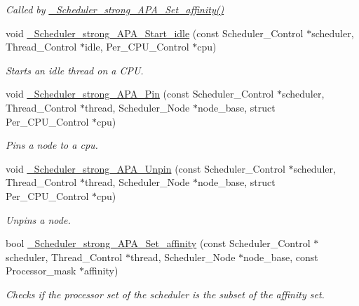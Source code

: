 \begin{DoxyCompactItemize}
\begin{DoxyCompactList}\small\item\em Called by \hyperlink{group__RTEMSScoreSchedulerStrongAPA_ga63ef624a9881cf77a2b1eef2c6f05223}{\+\_\+\+Scheduler\+\_\+strong\+\_\+\+A\+P\+A\+\_\+\+Set\+\_\+affinity()} \end{DoxyCompactList}\item 
void \hyperlink{group__RTEMSScoreSchedulerStrongAPA_ga218140a63c8168bd7a031ecd1622ac70}{\+\_\+\+Scheduler\+\_\+strong\+\_\+\+A\+P\+A\+\_\+\+Start\+\_\+idle} (const Scheduler\+\_\+\+Control $\ast$scheduler, Thread\+\_\+\+Control $\ast$idle, Per\+\_\+\+C\+P\+U\+\_\+\+Control $\ast$cpu)
\begin{DoxyCompactList}\small\item\em Starts an idle thread on a C\+PU. \end{DoxyCompactList}\item 
void \hyperlink{group__RTEMSScoreSchedulerStrongAPA_gab58b35b304568f654b0159782d7101b0}{\+\_\+\+Scheduler\+\_\+strong\+\_\+\+A\+P\+A\+\_\+\+Pin} (const Scheduler\+\_\+\+Control $\ast$scheduler, Thread\+\_\+\+Control $\ast$thread, Scheduler\+\_\+\+Node $\ast$node\+\_\+base, struct Per\+\_\+\+C\+P\+U\+\_\+\+Control $\ast$cpu)
\begin{DoxyCompactList}\small\item\em Pins a node to a cpu. \end{DoxyCompactList}\item 
void \hyperlink{group__RTEMSScoreSchedulerStrongAPA_ga14316e4743f9418a6fba4de3d982418a}{\+\_\+\+Scheduler\+\_\+strong\+\_\+\+A\+P\+A\+\_\+\+Unpin} (const Scheduler\+\_\+\+Control $\ast$scheduler, Thread\+\_\+\+Control $\ast$thread, Scheduler\+\_\+\+Node $\ast$node\+\_\+base, struct Per\+\_\+\+C\+P\+U\+\_\+\+Control $\ast$cpu)
\begin{DoxyCompactList}\small\item\em Unpins a node. \end{DoxyCompactList}\item 
bool \hyperlink{group__RTEMSScoreSchedulerStrongAPA_ga63ef624a9881cf77a2b1eef2c6f05223}{\+\_\+\+Scheduler\+\_\+strong\+\_\+\+A\+P\+A\+\_\+\+Set\+\_\+affinity} (const Scheduler\+\_\+\+Control $\ast$scheduler, Thread\+\_\+\+Control $\ast$thread, Scheduler\+\_\+\+Node $\ast$node\+\_\+base, const Processor\+\_\+mask $\ast$affinity)
\begin{DoxyCompactList}\small\item\em Checks if the processor set of the scheduler is the subset of the affinity set. \end{DoxyCompactList}\end{DoxyCompactItemize}


